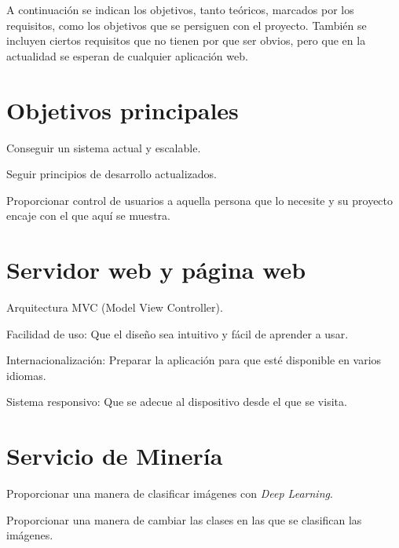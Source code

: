 
A continuación se indican los objetivos, tanto teóricos, marcados por los requisitos, como los objetivos que se persiguen con el proyecto. También se incluyen ciertos requisitos que no tienen por que ser obvios, pero que en la actualidad se esperan de cualquier aplicación web.



\section{Objetivos principales} 
\begin{list}{-}{}
\item Conseguir un sistema actual y escalable.
\item Seguir principios de desarrollo actualizados.
\item Proporcionar control de usuarios a aquella persona que lo necesite y su proyecto encaje con el que aquí se muestra.
\end{list}

\section{Servidor web y página web}
\begin{list}{-}{}
\item Arquitectura MVC (Model View Controller).
\item Facilidad de uso: Que el diseño sea intuitivo y fácil de aprender a usar.
\item Internacionalización: Preparar la aplicación para que esté disponible en varios idiomas.
\item Sistema responsivo: Que se adecue al dispositivo desde el que se visita.
\end{list}

\section{Servicio de Minería}
\begin{list}{-}{}
\item Proporcionar una manera de clasificar imágenes con \emph{Deep Learning}.
\item Proporcionar una manera de cambiar las clases en las que se clasifican las imágenes.
\end{list}

